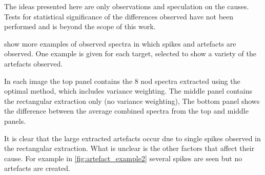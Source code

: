 The ideas presented here are only observations and speculation on the causes.
Tests for statistical significance of the differences observed have not been performed and is beyond the scope of this work.

 show more examples of observed spectra in which spikes and artefacts are observed.
One example is given for each target, selected to show a variety of the artefacts observed.

In each image the top panel contains the 8 nod spectra extracted using the optimal method, which includes variance weighting.
The middle panel contains the rectangular extraction only (no variance weighting), The bottom panel shows the difference between the average combined spectra from the top and middle panels.

It is clear that the large extracted artefacts occur due to single spikes observed in the rectangular extraction.
What is unclear is the other factors that affect their cause.
For example in \cref{fig:artefact_example2} several spikes are seen but no artefacts are created.
